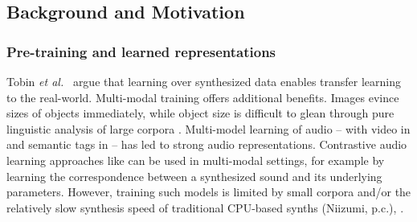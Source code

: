 \subsection{Background and Motivation}

\subsubsection{Pre-training and learned representations}

Tobin {\em et al.}~\cite{DBLP:conf/iros/TobinFRSZA17} argue that learning over synthesized data enables transfer learning to the real-world.
Multi-modal training offers additional benefits.
Images evince sizes of objects immediately, while object size is difficult to glean through pure linguistic analysis of large corpora  \cite{DBLP:conf/acl/ElazarMRBR19}.
Multi-model learning of audio -- with video in \cite{DBLP:conf/icassp/CramerWSB19} and semantic tags in \cite{drossos:icml:2020} -- has led to strong audio representations.
Contrastive audio learning approaches like \cite{saeed2020contrastive} can be used in multi-modal settings, for example by learning the correspondence between a synthesized sound and its underlying parameters.
However, training such models is limited by small corpora and/or the relatively slow synthesis speed of traditional CPU-based synths (Niizumi, p.c.),  \cite{masudo2021quality}.




